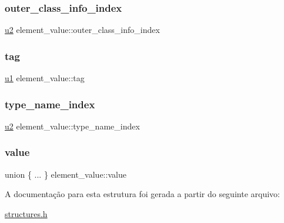 \subsubsection{\texorpdfstring{outer\+\_\+class\+\_\+info\+\_\+index}{outer\_class\_info\_index}}
{\footnotesize\ttfamily \hyperlink{lista__operandos_8h_a732cde1300aafb73b0ea6c2558a7a54f}{u2} element\+\_\+value\+::outer\+\_\+class\+\_\+info\+\_\+index}

\mbox{\label{structelement__value_a2664460cf3cbd50f7116dcc6fc5dc049}} 
\subsubsection{\texorpdfstring{tag}{tag}}
{\footnotesize\ttfamily \hyperlink{lista__operandos_8h_ad9f4cdb6757615aae2fad89dab3c5470}{u1} element\+\_\+value\+::tag}

\mbox{\label{structelement__value_ad1925807cc4b5a79fa7fa56d46462ecb}} 
\subsubsection{\texorpdfstring{type\+\_\+name\+\_\+index}{type\_name\_index}}
{\footnotesize\ttfamily \hyperlink{lista__operandos_8h_a732cde1300aafb73b0ea6c2558a7a54f}{u2} element\+\_\+value\+::type\+\_\+name\+\_\+index}

\mbox{\label{structelement__value_a4d0a32ca39ecb90de9af608585c10054}} 
\subsubsection{\texorpdfstring{value}{value}}
{\footnotesize\ttfamily union \{ ... \}   element\+\_\+value\+::value}



A documentação para esta estrutura foi gerada a partir do seguinte arquivo\+:\begin{DoxyCompactItemize}
\item 
\hyperlink{structures_8h}{structures.\+h}\end{DoxyCompactItemize}

